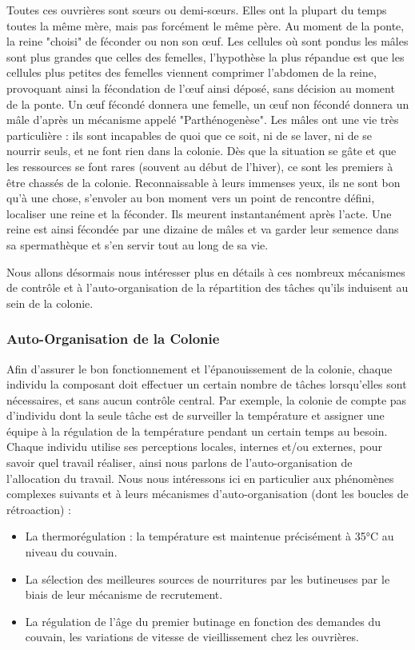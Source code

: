 			Toutes ces ouvrières sont sœurs ou demi-sœurs. Elles ont la plupart du temps toutes la même mère, mais pas forcément le même père. Au moment de la ponte, la reine "choisi" de féconder ou non son œuf. Les cellules où sont pondus les mâles sont plus grandes que celles des femelles, l'hypothèse la plus répandue est que les cellules plus petites des femelles viennent comprimer l'abdomen de la reine, provoquant ainsi la fécondation de l'œuf ainsi déposé, sans décision au moment de la ponte. Un œuf fécondé donnera une femelle, un œuf non fécondé donnera un mâle d'après un mécanisme appelé "Parthénogenèse". Les mâles ont une vie très particulière : ils sont incapables de quoi que ce soit, ni de se laver, ni de se nourrir seuls, et ne font rien dans la colonie. Dès que la situation se gâte et que les ressources se font rares (souvent au début de l'hiver), ce sont les premiers à être chassés de la colonie. Reconnaissable à leurs immenses yeux, ils ne sont bon qu'à une chose, s'envoler au bon moment vers un point de rencontre défini, localiser une reine et la féconder. Ils meurent instantanément après l'acte. Une reine est ainsi fécondée par une dizaine de mâles et va garder leur semence dans sa spermathèque et s'en servir tout au long de sa vie.
			
			Nous allons désormais nous intéresser plus en détails à ces nombreux mécanismes de contrôle et à l'auto-organisation de la répartition des tâches qu'ils induisent au sein de la colonie.
			
		\subsubsection{Auto-Organisation de la Colonie}
			Afin d'assurer le bon fonctionnement et l'épanouissement de la colonie, chaque individu la composant doit effectuer un certain nombre de tâches lorsqu'elles sont nécessaires, et sans aucun contrôle central. Par exemple, la colonie de compte pas d'individu dont la seule tâche est de surveiller la température et assigner une équipe à la régulation de la température pendant un certain temps au besoin. Chaque individu utilise ses perceptions locales, internes et/ou externes, pour savoir quel travail réaliser, ainsi nous parlons de l'auto-organisation de l'allocation du travail. Nous nous intéressons ici en particulier aux phénomènes complexes suivants et à leurs mécanismes d'auto-organisation (dont les boucles de rétroaction) :
			
			
			\begin{itemize}
				\item La thermorégulation : la température est maintenue précisément à 35°C au niveau du couvain.
				\item La sélection des meilleures sources de nourritures par les butineuses par le biais de leur mécanisme de recrutement.
				\item La régulation de l'âge du premier butinage en fonction des demandes du couvain, les variations de vitesse de vieillissement chez les ouvrières.
			\end{itemize}


